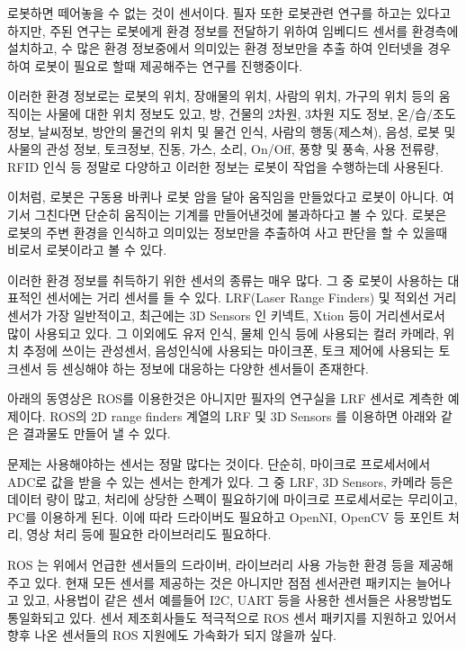로봇하면 떼어놓을 수 없는 것이 센서이다. 필자 또한 로봇관련 연구를 하고는 있다고 하지만, 주된 연구는 로봇에게 환경 정보를 전달하기 위하여 임베디드 센서를 환경측에 설치하고, 수 많은 환경 정보중에서 의미있는 환경 정보만을 추출 하여 인터넷을 경우하여 로봇이 필요로 할때 제공해주는 연구를 진행중이다. 

이러한 환경 정보로는 로봇의 위치, 장애물의 위치, 사람의 위치, 가구의 위치 등의 움직이는 사물에 대한 위치 정보도 있고, 방, 건물의 2차원, 3차원 지도 정보, 온/습/조도 정보, 날씨정보, 방안의 물건의 위치 및 물건 인식, 사람의 행동(제스쳐), 음성, 로봇 및 사물의 관성 정보, 토크정보, 진동, 가스, 소리, On/Off, 풍향 및 풍속, 사용 전류량, RFID 인식 등 정말로 다양하고 이러한 정보는 로봇이 작업을 수행하는데 사용된다.

이처럼, 로봇은 구동용 바퀴나 로봇 암을 달아 움직임을 만들었다고 로봇이 아니다. 여기서 그친다면 단순히 움직이는 기계를 만들어낸것에 불과하다고 볼 수 있다. 로봇은 로봇의 주변 환경을 인식하고 의미있는 정보만을 추출하여 사고 판단을 할 수 있을때 비로서 로봇이라고 볼 수 있다. 

이러한 환경 정보를 취득하기 위한 센서의 종류는 매우 많다. 그 중 로봇이 사용하는 대표적인 센서에는 거리 센서를 들 수 있다. LRF(Laser Range Finders) 및 적외선 거리센서가 가장 일반적이고, 최근에는 3D Sensors 인 키넥트, Xtion 등이 거리센서로서 많이 사용되고 있다. 그 이외에도 유저 인식, 물체 인식 등에 사용되는 컬러 카메라, 위치 추정에 쓰이는 관성센서, 음성인식에 사용되는 마이크폰, 토크 제어에 사용되는 토크센서 등 센싱해야 하는 정보에 대응하는 다양한 센서들이 존재한다.

아래의 동영상은 ROS를 이용한것은 아니지만 필자의 연구실을 LRF 센서로 계측한 예제이다. ROS의 2D range finders 계열의 LRF 및 3D Sensors 를 이용하면 아래와 같은 결과물도 만들어 낼 수 있다.


문제는 사용해야하는 센서는 정말 많다는 것이다. 단순히, 마이크로 프로세서에서 ADC로 값을 받을 수 있는 센서는 한계가 있다. 그 중 LRF, 3D Sensors, 카메라 등은 데이터 량이 많고, 처리에 상당한 스펙이 필요하기에 마이크로 프로세서로는 무리이고, PC를 이용하게 된다. 이에 따라 드라이버도 필요하고 OpenNI, OpenCV 등 포인트 처리, 영상 처리 등에 필요한 라이브러리도 필요하다.

ROS 는 위에서 언급한 센서들의 드라이버, 라이브러리 사용 가능한 환경 등을 제공해주고 있다. 현재 모든 센서를 제공하는 것은 아니지만 점점 센서관련 패키지는 늘어나고 있고, 사용법이 같은 센서 예를들어 I2C, UART 등을 사용한 센서들은 사용방법도 통일화되고 있다. 센서 제조회사들도 적극적으로 ROS 센서 패키지를 지원하고 있어서 향후 나온 센서들의 ROS 지원에도 가속화가 되지 않을까 싶다.

